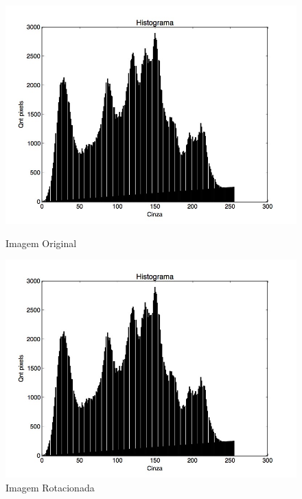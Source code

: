 \documentclass{article}
\begin{document}
\FloatBarrier
\begin{figure}[!htb]
\begin{minipage}[b]{0.45\linewidth}
\centering
\includegraphics[scale=0.25]{Histo_lena_B.jpg}
\caption{Imagem Original}
\label{fig:original}
\end{minipage}
\hspace{0.5cm}
\begin{minipage}[b]{0.45\linewidth}
\centering
\includegraphics[scale=0.25]{Histo_TransLinearRot.jpg}
\caption{Imagem Rotacionada}
\label{fig:rota}
\end{minipage}
\end{figure}
\FloatBarrier

\newpage
\end{document}
